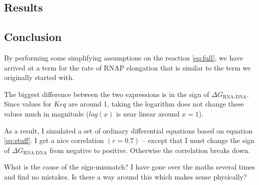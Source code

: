 \documentclass[a4paper]{article}
\begin{document}
\subsection{Results}

\subsection{Conclusion}
By performing some simplifying assumptions on the reaction \ref{eq:full}, we
have arrived at a term for the rate of RNAP elongation that is similar to the
term we originally started with.

The biggest difference between the two expressions is in the sign of $\Delta
G_{\text{RNA-DNA}}$. Since values for $Keq$ are around 1, taking the logarithm
does not change these values much in magnitude ($log(x)$ is near linear around
$x = 1$).

As a result, I simulated a set of ordinary differential equations based on
equation \ref{eq:stuff}. I get a nice correlation $(r = 0.7)$ -- except that I
must change the sign of $\Delta G_{\text{RNA-DNA}}$ from negative to positive.
Otherwise the correlation breaks down.

What is the cause of the sign-mismatch? I have gone over the maths several
times and find no mistakes. Is there a way around this which makes sense
physically?

\end{document}
